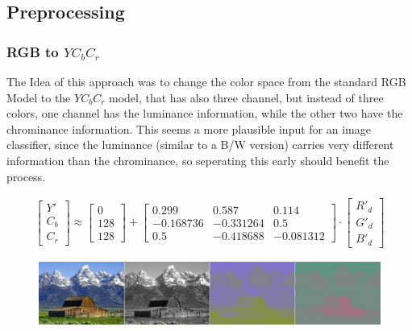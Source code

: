 \subsection{Preprocessing}
\subsubsection{RGB to $YC_bC_r$}
The Idea of this approach was to change the color space from the standard RGB Model to the $YC_bC_r$ model, that has also three channel, but instead of three colors, one channel has the luminance information, while the other two have the chrominance information. This seems a more plausible input for an image classifier, since the luminance (similar to a B/W version) carries very different information than the chrominance, so seperating this early should benefit the process. 

\begin{align}
\left[\begin{array}{c}Y' \\ C_b \\ C_r\end{array}\right]
\approx
\left[\begin{array}{c}0  \\ 128 \\ 128\end{array}\right]
+
\left[\begin{array}{ccc} 0.299 & 0.587 & 0.114\\ -0.168736 & -0.331264 & 0.5  \\ 0.5 & -0.418688 & -0.081312\end{array}\right]
\cdot
\left[\begin{array}{c}R'_d \\ G'_d \\ B'_d\end{array}\right]\label{eq:ycc}
\end{align}

\begin{figure}\centering
\includegraphics[width=1\textwidth]{./img/barn_rgb_ycc.jpg}

\end{figure}

